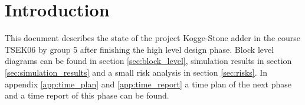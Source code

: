 \section{Introduction}
This document describes the state of the project Kogge-Stone adder in the course TSEK06 by group 5 after finishing the high level design phase. Block level diagrams can be found in section \ref{sec:block_level}, simulation results in section \ref{sec:simulation_results} and a small risk analysis in section \ref{sec:risks}. In appendix \ref{app:time_plan} and \ref{app:time_report} a time plan of the next phase and a time report of this phase can be found.
